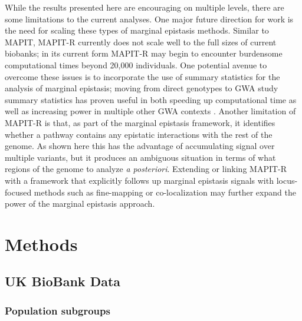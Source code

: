 \documentclass[12pt,a4paper]{article}
\begin{document}
While the results presented here are encouraging on multiple levels, there are some limitations to the current analyses. One major future direction for work is the need for scaling these types of marginal epistasis methods. Similar to MAPIT, MAPIT-R currently does not scale well to the full sizes of current biobanks; in its current form MAPIT-R may begin to encounter burdensome computational times beyond 20,000 individuals. One potential avenue to overcome these issues is to incorporate the use of summary statistics for the analysis of marginal epistasis; moving from direct genotypes to GWA study summary statistics has proven useful in both speeding up computational time as well as increasing power in multiple other GWA contexts \citep{Shi2016,Johnson2018,Ray2018,Cheng2019,Turchin2019,Urbut2019}. Another limitation of MAPIT-R is that, as part of the marginal epistasis framework, it identifies whether a pathway contains any epistatic interactions with the rest of the genome. As shown here this has the advantage of accumulating signal over multiple variants, but it produces an ambiguous situation in terms of what regions of the genome to analyze \textit{a posteriori}. Extending or linking MAPIT-R with a framework that explicitly follows up marginal epistasis signals with locus-focused methods such as fine-mapping \citep{Kichaev2014,Chen2015,Benner2016} or co-localization \citep{Hormozdiari2016,Zhu2016,Wen2017,Giambartolomei2018,Wallace2020} may further expand the power of the marginal epistasis approach.  

\section{Methods}\label{InterPath-Online-Methods}

\subsection{UK BioBank Data}

\subsubsection{Population subgroups}
\end{document}
